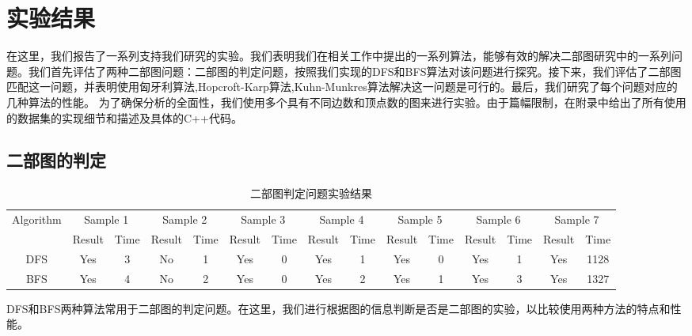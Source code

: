 \newcommand{\subsubsubsection}[1]{\paragraph{#1}\mbox{}\\}
\setcounter{secnumdepth}{4} %
\setcounter{tocdepth}{4} %

\section{\mbox{实验结果}}
在这里，我们报告了一系列支持我们研究的实验。我们表明我们在相关工作中提出的一系列算法，能够有效的解决二部图研究中的一系列问题。我们首先评估了两种二部图问题：二部图的判定问题，按照我们实现的DFS和BFS算法对该问题进行探究。接下来，我们评估了二部图匹配这一问题，并表明使用匈牙利算法,Hopcroft-Karp算法,Kuhn-Munkres算法解决这一问题是可行的。最后，我们研究了每个问题对应的几种算法的性能。
为了确保分析的全面性，我们使用多个具有不同边数和顶点数的图来进行实验。由于篇幅限制，在附录中给出了所有使用的数据集的实现细节和描述及具体的C++代码。

\subsection{\textbf{\mbox{二部图的判定}}}
\begin{table*}
	
	\caption{二部图判定问题实验结果}
	\label{tab_demo}
	\centering
	\linewidth
	\begin{tabular*}{0.99\linewidth}{@{}ccccccccccccccc@{}}
		\hline
		\multirow{2}{*}{Algorithm} & \multicolumn{2}{c}{Sample 1} & \multicolumn{2}{c}{Sample 2} & \multicolumn{2}{c}{Sample 3} & \multicolumn{2}{c}{Sample 4} & \multicolumn{2}{c}{Sample 5} &\multicolumn{2}{c}{Sample 6} &\multicolumn{2}{c}{Sample 7}\\
		
		 &Result & Time &  Result & Time &Result & Time &Result & Time &Result & Time &Result & Time &Result & Time \\
		\hline
		DFS  & Yes & 3  & No & 1  &Yes & 0  &Yes & 1  &Yes & 0  &Yes & 1  &Yes & 1128    \\
		BFS  & Yes & 4 &  No & 2 &Yes & 0 &Yes & 2 &Yes & 1 &Yes & 3 &Yes & 1327 \\
		\hline
	\end{tabular*}
\end{table*}
DFS和BFS两种算法常用于二部图的判定问题。在这里，我们进行根据图的信息判断是否是二部图的实验，以比较使用两种方法的特点和性能。

